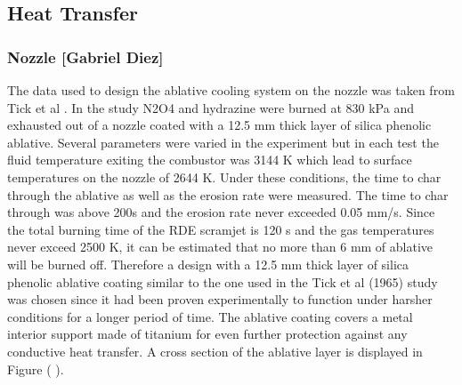 \subsection{Heat Transfer}


\subsubsection{Nozzle [Gabriel Diez]}

The data used to design the ablative cooling system on the nozzle was taken from Tick et al \cite{tick}. In the study N2O4 and hydrazine were burned at 830 kPa and exhausted out of a nozzle coated with a 12.5 mm thick layer of silica phenolic ablative. Several parameters were varied in the experiment but in each test the fluid temperature exiting the combustor was 3144 K which lead to surface temperatures on the nozzle of 2644 K. Under these conditions, the time to char through the ablative as well as the erosion rate were measured. The time to char through was above 200s and the erosion rate never exceeded 0.05 mm/s. Since the total burning time of the RDE scramjet is 120 s and the gas temperatures never exceed 2500 K, it can be estimated that no more than 6 mm of ablative will be burned off. Therefore a design with a 12.5 mm thick layer of silica phenolic ablative coating similar to the one used in the Tick et al (1965) study was chosen since it had been proven experimentally to function under harsher conditions for a longer period of time. The ablative coating covers a metal interior support made of titanium for even further protection against any conductive heat transfer. A cross section of the ablative layer is displayed in Figure ( ).


